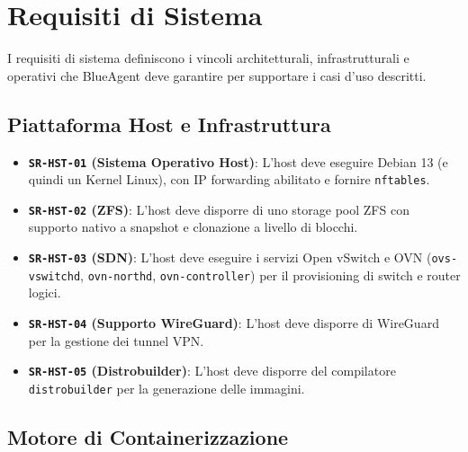 \section{Requisiti di Sistema}\label{requisiti-di-sistema}

I requisiti di sistema definiscono i vincoli architetturali,
infrastrutturali e operativi che BlueAgent deve garantire per supportare
i casi d'uso descritti.

\subsection{Piattaforma Host e
Infrastruttura}\label{piattaforma-host-e-infrastruttura}

\begin{itemize}
\tightlist
\item
  \textbf{\passthrough{\lstinline!SR-HST-01!} (Sistema Operativo Host)}:
  L'host deve eseguire Debian 13 (e quindi un Kernel Linux), con IP
  forwarding abilitato e fornire \passthrough{\lstinline!nftables!}.
\item
  \textbf{\passthrough{\lstinline!SR-HST-02!} (ZFS)}: L'host deve
  disporre di uno storage pool ZFS con supporto nativo a snapshot e
  clonazione a livello di blocchi.
\item
  \textbf{\passthrough{\lstinline!SR-HST-03!} (SDN)}: L'host deve
  eseguire i servizi Open vSwitch e OVN
  (\passthrough{\lstinline!ovs-vswitchd!},
  \passthrough{\lstinline!ovn-northd!},
  \passthrough{\lstinline!ovn-controller!}) per il provisioning di
  switch e router logici.
\item
  \textbf{\passthrough{\lstinline!SR-HST-04!} (Supporto WireGuard)}:
  L'host deve disporre di WireGuard per la gestione dei tunnel VPN.
\item
  \textbf{\passthrough{\lstinline!SR-HST-05!} (Distrobuilder)}: L'host
  deve disporre del compilatore \passthrough{\lstinline!distrobuilder!}
  per la generazione delle immagini.
\end{itemize}

\subsection{Motore di
Containerizzazione}\label{motore-di-containerizzazione}


